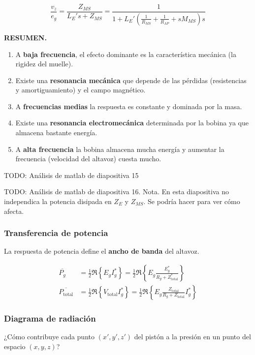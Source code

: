 \documentclass[12pt, a4paper]{article}
\begin{document}
\[ \frac{v_z}{e_g} = \frac{Z_{MS}}{L_E's + Z_{MS}} = \frac{1}{1 + L_E' \left( \frac{1}{R_{MS}} + \frac{1}{R_{AP}} + sM_{MS} \right) s }  \]

\textbf{RESUMEN.} 
\begin{enumerate}
     \item A \textbf{baja frecuencia}, el efecto dominante es la característica mecánica (la rigidez del muelle).
     \item Existe una \textbf{resonancia mecánica} que depende de las pérdidas (resistencias y amortiguamiento) y el campo magnético.
     \item A \textbf{frecuencias medias} la respuesta es constante y dominada por la masa.
     \item Existe una \textbf{resonancia electromecánica} determinada por la bobina ya que almacena bastante energía.
     \item A \textbf{alta frecuencia} la bobina almacena mucha energía y aumentar la frecuencia (velocidad del altavoz) cuesta mucho.
\end{enumerate}

TODO: Análisis de matlab de diapositiva 15

TODO: Análisis de matlab de diapositiva 16. Nota. En esta diapositiva no independica la potencia disipada en $Z_E$ y $Z_{MS}$. Se podría hacer para ver cómo afecta.

\subsubsection{Transferencia de potencia}

La respuesta de potencia define el \textbf{ancho de banda} del altavoz.

\begin{align*}
    \overline{P_g} &= \frac{1}{2} \Re \left\lbrace E_g I_g^* \right\rbrace = \frac{1}{2} \Re \left\lbrace E_g \frac{E_g^*}{R_g + Z^*_{\text{total}}} \right\rbrace \\
    \overline{P _{\text{total}}} &= \frac{1}{2} \Re \left\lbrace V _{\text{total}} I_g^* \right\rbrace = \frac{1}{2} \Re \left\lbrace E_g \frac{Z_{\text{total}}}{R_g + Z_{\text{total}}} I_g^* \right\rbrace 
\end{align*}

\subsubsection{Diagrama de radiación}

¿Cómo contribuye cada punto $\left( x', y', z' \right)$ del pistón a la presión en un punto del espacio $\left( x, y, z \right)$?
\end{document}
